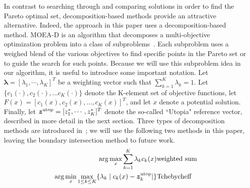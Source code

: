 \documentclass{article}
\begin{document}

In contrast to searching through and comparing solutions in order to find the Pareto optimal set, decomposition-based methods provide an attractive alternative.  
Indeed, the approach in this paper uses a decomposition-based method.  
MOEA-D is an algorithm that decomposes a multi-objective optimization problem into a class of subproblems~\cite{4358754}.  
Each subproblem uses a weighed blend of the various objectives to find specific points in the Pareto set or to guide the search for such points.  
Because we  will use this subproblem idea in our algorithm, it is useful to introduce some important notation.
Let $ \bm{\lambda} = [ \lambda_{1} , \cdots , \lambda_{K}  ]^{T} $ be a weighting vector such that $ \sum_{k=1}^{K} \lambda_{k} = 1 $.  Let $\{c_{1}(\cdot), c_{2}(\cdot), \ldots c_{K}(\cdot)\}$ denote the K-element set of objective functions, let $F(x) = [c_{1}(x), c_{2}(x), \ldots, c_{K}(x)]^T$, and let $x$ denote a potential solution.  Finally, let $ \bm{z}^{\rm utop} = [z^{*}_{1}, \cdots , z^{*}_{K}]^{T} $ denote the so-called ``Utopia" reference vector, described in more detail in the next section. 
Three types of decomposition methods are introduced in~\cite{4358754}; we will use the following two methods in this paper, leaving the boundary intersection method to future work.
\begin{eqnarray}
 \arg\max_x \sum_{k=1}^{K} \lambda_{k} c_{k} (x) & {\rm weighted \ sum} \label{eq:weighted}\\
 \arg\min_x\max_{1 \leq k \leq K}  \{ \lambda_{k} \mid c_{k}(x) - \bm{z}^{\rm utop}_{k}  | \} & {\rm Tchebycheff} \label{eq:Tchebycheff}%
\end{eqnarray}
\end{document}
